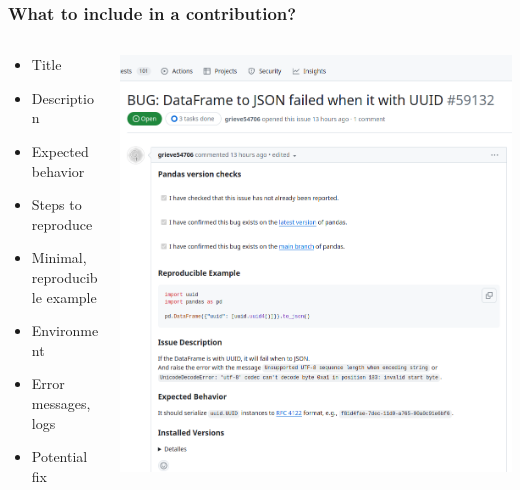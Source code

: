 \documentclass{beamer}
\begin{document}
	\begin{frame}
		\frametitle{What to include in a contribution?}
		\begin{columns}
			\begin{column}{0.3\textwidth}
				\footnotesize
				\begin{itemize}
					\item Title
					\item Description
					\item Expected behavior
					\item Steps to reproduce
					\item Minimal, reproducible example
					\item Environment
					\item Error messages, logs
					\item Potential fix
				\end{itemize}
			\end{column}
			\begin{column}{0.7\textwidth}
				\includegraphics[width=\textwidth]{pandas_issue}
			\end{column}
		\end{columns}
	\end{frame}
	
	
\end{document}
